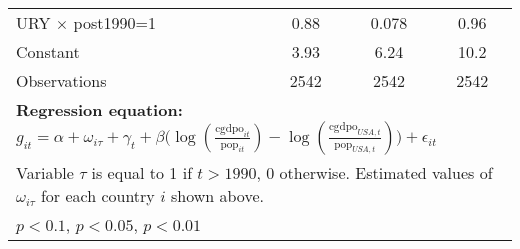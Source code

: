 \begin{sidewaystable}[htbp]
\begin{tabular}{l*{3}{c}}
URY $\times$ post1990=1&     0.88\sym{***}&    0.078         &     0.96\sym{***}\\
Constant        &     3.93         &     6.24\sym{**} &     10.2\sym{**} \\
\midrule
Observations    &     2542         &     2542         &     2542         \\
\bottomrule
\multicolumn{4}{l}{\footnotesize \textbf{Regression equation:} \(g_{it} = \alpha + \omega_{i\tau} + \gamma_t + \beta \big(\log (\frac{\textrm{cgdpo}_{it}}{\textrm{pop}_{it}} ) - \log (\frac{\textrm{cgdpo}_{USA,t}}{\textrm{pop}_{USA,t}}  ) \big) + \epsilon_{it}\)}\\
\multicolumn{4}{l}{\footnotesize Variable \(\tau\) is equal to 1 if \(t > 1990\), 0 otherwise. Estimated values of \(\omega_{i\tau}\) for each country \(i\) shown above.}\\
\multicolumn{4}{l}{\footnotesize \sym{*} \(p<0.1\), \sym{**} \(p<0.05\), \sym{***} \(p<0.01\)}\\
\end{tabular}
\end{sidewaystable}
